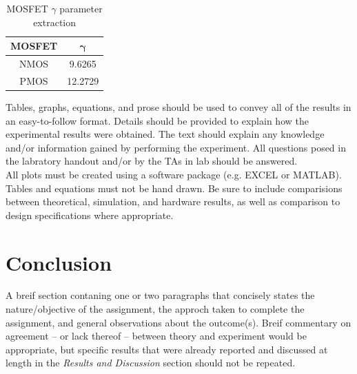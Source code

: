 \documentclass[11pt]{article}
\begin{document}
	\begin{table}[H]
		\centering
		\caption{MOSFET \(\gamma\) parameter extraction}
		\label{table:experimental_body}
		\begin{tabular}{|c|c|}
			\hline
			\textbf{MOSFET} & \(\mathbf{\gamma}\)\\
			\hline
			NMOS & 9.6265\\
			PMOS & 12.2729\\
			\hline
		\end{tabular}
	\end{table}
	Tables, graphs, equations, and prose should be used to convey all of the
	results in an easy-to-follow format. Details should be provided to 
	explain how the experimental results were obtained. The text should 
	explain any knowledge and/or information gained by performing the experiment.
	All questions posed in the labratory handout and/or by the TAs in lab should
	be answered.\\
	\hfill \break
	All plots must be created using a software package (e.g. EXCEL or MATLAB).
	Tables and equations must not be hand drawn. Be sure to include comparisions
	between theoretical, simulation, and hardware results, as well as
	comparison to design specifications where appropriate.

	\section{Conclusion}
	A breif section contaning one or two paragraphs that concisely states the
	nature/objective of the assignment, the approch taken to complete the
	assignment, and general observations about the outcome(s). Breif commentary
	on agreement -- or lack thereof -- between theory and experiment would be 
	appropriate, but specific results that were already reported and discussed
	at length in the \textit{Results and Discussion} section should not be 
	repeated.
\end{document}
